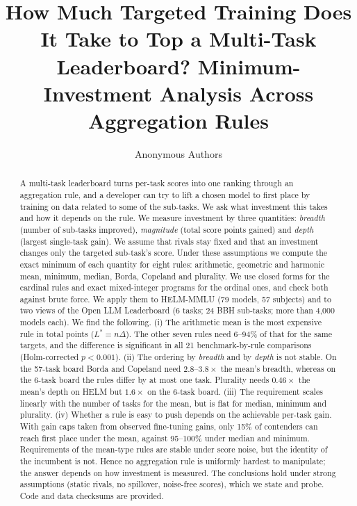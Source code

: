 \documentclass{article}
\title{How Much Targeted Training Does It Take to Top a Multi-Task Leaderboard? Minimum-Investment Analysis Across Aggregation Rules}
\author{Anonymous Authors}
\theoremstyle{remark}
\begin{document}
\maketitle

\begin{abstract}
A multi-task leaderboard turns per-task scores into one ranking through an aggregation rule, and a developer can try to lift a chosen model to first place by training on data related to some of the sub-tasks. We ask what investment this takes and how it depends on the rule. We measure investment by three quantities: \emph{breadth} (number of sub-tasks improved), \emph{magnitude} (total score points gained) and \emph{depth} (largest single-task gain). We assume that rivals stay fixed and that an investment changes only the targeted sub-task's score. Under these assumptions we compute the exact minimum of each quantity for eight rules: arithmetic, geometric and harmonic mean, minimum, median, Borda, Copeland and plurality. We use closed forms for the cardinal rules and exact mixed-integer programs for the ordinal ones, and check both against brute force. We apply them to HELM-MMLU (79 models, 57 subjects) and to two views of the Open LLM Leaderboard (6 tasks; 24 BBH sub-tasks; more than 4,000 models each). We find the following. (i) The arithmetic mean is the most expensive rule in total points ($L^\ast=n\Delta$). The other seven rules need 6--94\% of that for the same targets, and the difference is significant in all 21 benchmark-by-rule comparisons (Holm-corrected $p<0.001$). (ii) The ordering by \emph{breadth} and by \emph{depth} is not stable. On the 57-task board Borda and Copeland need $2.8$--$3.8\times$ the mean's breadth, whereas on the 6-task board the rules differ by at most one task. Plurality needs $0.46\times$ the mean's depth on HELM but $1.6\times$ on the 6-task board. (iii) The requirement scales linearly with the number of tasks for the mean, but is flat for median, minimum and plurality. (iv) Whether a rule is easy to push depends on the achievable per-task gain. With gain caps taken from observed fine-tuning gains, only 15\% of contenders can reach first place under the mean, against 95--100\% under median and minimum. Requirements of the mean-type rules are stable under score noise, but the identity of the incumbent is not. Hence no aggregation rule is uniformly hardest to manipulate; the answer depends on how investment is measured. The conclusions hold under strong assumptions (static rivals, no spillover, noise-free scores), which we state and probe. Code and data checksums are provided.
\end{abstract}
\end{document}
